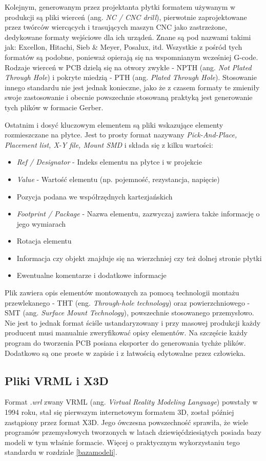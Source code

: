 \documentclass[brudnopis]{xmgr}
\begin{document}
Kolejnym, generowanym przez projektanta płytki formatem używanym w produkcji są pliki wierceń (ang. \emph{NC / CNC drill}), pierwotnie zaprojektowane przez twórców wiercących i trasujących maszyn CNC jako zastrzeżone, dedykowane formaty wejściowe dla ich urządeń. Znane są pod nazwami takimi jak: Excellon, Hitachi, Sieb \& Meyer, Posalux, itd.\cite{Charras} Wszystkie z pośród tych formatów są podobne, ponieważ opierają się na wspomnianym wcześniej G-code. Rodzaje wierceń w PCB dzielą się na otwory zwykłe - NPTH (ang. \emph{Not Plated Through Hole}) i pokryte miedzią - PTH (ang. \emph{Plated Through Hole}).\cite{voldman} Stosowanie innego standardu nie jest jednak konieczne, jako że z czasem formaty te zmieniły swoje zastosowanie i obecnie powszechnie stosowaną praktyką jest generowanie tych plików w formacie Gerber.

Ostatnim i dosyć kluczowym elementem są pliki wskazujące elementy rozmieszczane na płytce. Jest to prosty format nazywany \emph {Pick-And-Place, Placement list, X-Y file, Mount SMD}  i składa się z kilku wartości:
\begin{itemize}
\item \emph{Ref / Designator} - Indeks elementu na płytce i w projekcie
\item \emph{Value} - Wartość elementu (np. pojemność, rezystancja, napięcie)
\item Pozycja podana we współrzędnych kartezjańskich
\item \emph{Footprint / Package} - Nazwa elementu, zazwyczaj zawiera także informację o jego wymiarach
\item Rotacja elementu
\item Informacja czy objekt znajduje się na wierzchniej czy też dolnej stronie płytki
\item Ewentualne komentarze i dodatkowe informacje
\end{itemize}
Plik zawiera opis elementów montowanych za pomocą technologii montażu przewlekanego - THT (eng. \emph{Through-hole technology}) oraz powierzchniowego - SMT (ang. \emph{Surface Mount Technology}), powszechnie stosowanego przemysłowo.\cite {prasad} Nie jest to jednak format ściśle ustandaryzowany i przy masowej produkcji każdy producent musi manualnie zweryfikować opisy elementów. Na szczęście każdy program do tworzenia PCB posiana eksporter do generowania tychże plików. Dodatkowo są one proste w zapisie i z łatwością edytowalne przez człowieka.

\subsection{Pliki VRML i X3D}
Format \emph{.wrl} zwany VRML (ang. \emph {Virtual Reality Modeling Language}) powstały w 1994 roku, stał się pierwszym internetowym formatem 3D, został później zastąpiony przez format X3D.\cite{vrml} Jego ówczesna powszechność sprawiła, że wiele programów przemysłowych tworzonych w latach dziewięćdziesiątych posiada bazy modeli w tym właśnie formacie. Więcej o praktycznym wykorzystaniu tego standardu w rozdziale \ref{bazamodeli}.
\end{document}
